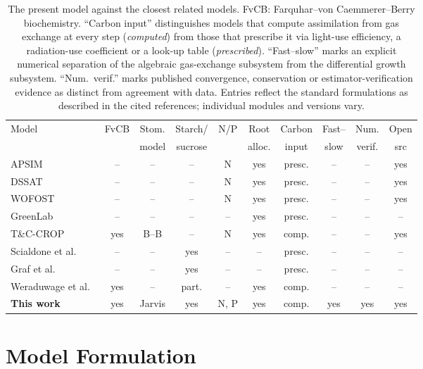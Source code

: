 \documentclass[a4paper,fleqn]{cas-sc}
\begin{document}
\begin{table}[!htbp]
\centering
\scriptsize
\caption{The present model against the closest related models. FvCB:
Farquhar--von Caemmerer--Berry biochemistry. ``Carbon input'' distinguishes
models that compute assimilation from gas exchange at every step (\emph{computed})
from those that prescribe it via light-use efficiency, a radiation-use
coefficient or a look-up table (\emph{prescribed}). ``Fast--slow'' marks an
explicit numerical separation of the algebraic gas-exchange subsystem from the
differential growth subsystem. ``Num.\ verif.'' marks published convergence,
conservation or estimator-verification evidence as distinct from
agreement with data. Entries reflect the standard formulations as described in
the cited references; individual modules and versions vary.}
\label{tab:related}
\footnotesize
\setlength{\tabcolsep}{3.2pt}
\begin{tabular}{@{}lccccccccc@{}}
\toprule
Model & FvCB & Stom. & Starch/ & N/P & Root & Carbon & Fast-- & Num. & Open \\
      &      & model & sucrose &     & alloc.& input  & slow   & verif.& src \\
\midrule
APSIM \cite{Holzworth2014}      & --  & --      & --  & N   & yes & presc. & -- & -- & yes \\
DSSAT \cite{Jones2003}          & --  & --      & --  & N   & yes & presc. & -- & -- & yes \\
WOFOST \cite{deWit2019}         & --  & --      & --  & N   & yes & presc. & -- & -- & yes \\
GreenLab \cite{DeReffye2020}    & --  & --      & --  & --  & yes & presc. & -- & -- & -- \\
T\&C-CROP \cite{BuckleyPaules2025} & yes & B--B & -- & N & yes & comp. & -- & -- & yes \\
Scialdone et al.\ \cite{Scialdone2013} & -- & -- & yes & -- & -- & presc. & -- & -- & -- \\
Graf et al.\ \cite{Graf2010}         & -- & --  & yes & -- & -- & presc. & -- & -- & -- \\
Weraduwage et al.\ \cite{Weraduwage2015} & yes & -- & part. & -- & yes & comp. & -- & -- & -- \\
\midrule
\textbf{This work} & yes & Jarvis & yes & N, P & yes & comp. &
  yes & yes & yes \\
\bottomrule
\end{tabular}
\end{table}

\section{Model Formulation}
\label{sec:model}
\end{document}
